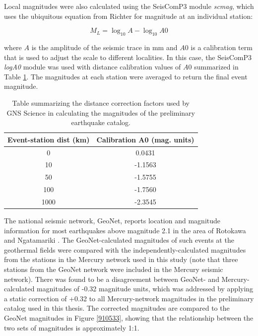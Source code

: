 Local magnitudes were also calculated using the SeisComP3 module \textit{scmag}, which uses the ubiquitous equation from Richter \citep{richter1935instrumental} for magnitude at an individual station:

\begin{equation}
M_L = \log_{10}{A} - \log_{10}A0
\end{equation}

where $A$ is the amplitude of the seismic trace in mm and $A0$ is a calibration term that is used to adjust the scale to different localities. In this case, the SeisComP3 \textit{logA0} module was used with distance calibration values of $A0$ summarized in Table \ref{table_A0}. The magnitudes at each station were averaged to return the final event magnitude.
\begin{table}
\centering
\begin{tabular}{cc}
    {Event-station dist (km)} & {Calibration A0 (mag. units)} \\ \midrule
    0  & 0.0431 \\
    10  & -1.1563  \\
    50  & -1.5755  \\
    100  & -1.7560  \\
    1000  & -2.3545   \\
\end{tabular}
\caption[Magnitude calculation distance correction factors]{{
Table summarizing the distance correction factors used by GNS Science in calculating the magnitudes of the preliminary earthquake catalog.}}
\label{table_A0}
\end{table}

The national seismic network, GeoNet, reports location and magnitude information for most earthquakes above magnitude 2.1 in the area of Rotokawa and Ngatamariki \citep{Sherburn_2015}. The GeoNet-calculated magnitudes of such events at the geothermal fields were compared with the independently-calculated magnitudes from the stations in the Mercury network used in this study (note that three stations from the GeoNet network were included in the Mercury seismic network). There was found to be a disagreement between GeoNet- and Mercury-calculated magnitudes of -0.32 magnitude units, which was addressed by applying a static correction of +0.32 to all Mercury-network magnitudes in the preliminary catalog used in this thesis. The corrected magnitudes are compared to the GeoNet magnitudes in Figure \ref{910533}, showing that the relationship between the two sets of magnitudes is approximately 1:1.

